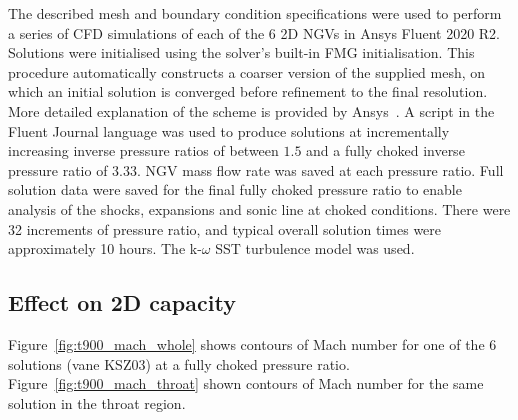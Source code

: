\documentclass[a4paper, 11pt, oneside]{report}
\begin{document}
The described mesh and boundary condition specifications were used to perform a series of CFD simulations of each of the 6 2D NGVs in Ansys Fluent 2020 R2. Solutions were initialised using the solver's built-in FMG initialisation. This procedure automatically constructs a coarser version of the supplied mesh, on which an initial solution is converged before refinement to the final resolution. More detailed explanation of the scheme is provided by Ansys~\cite{ansys_fmg_initialisation}. A script in the Fluent Journal language was used to produce solutions at incrementally increasing inverse pressure ratios of between $1.5$ and a fully choked inverse pressure ratio of $3.33$. NGV mass flow rate was saved at each pressure ratio. Full solution data were saved for the final fully choked pressure ratio to enable analysis of the shocks, expansions and sonic line at choked conditions. There were 32 increments of pressure ratio, and typical overall solution times were approximately 10 hours. The k-$\omega$ SST turbulence model was used.

\subsection{Effect on 2D capacity}

Figure~\ref{fig:t900_mach_whole} shows contours of Mach number for one of the 6 solutions (vane KSZ03) at a fully choked pressure ratio. Figure~\ref{fig:t900_mach_throat} shown contours of Mach number for the same solution in the throat region.
\end{document}

